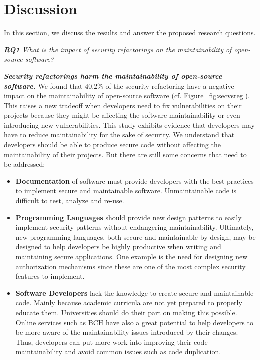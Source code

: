 \documentclass[sigconf,review]{acmart}
\begin{document}
\section{Discussion}\label{sec:discussion}

In this section, we discuss the results and answer the proposed research questions.

\begin{framed}
\textit{\textbf{RQ1} What is the impact of security refactorings on the maintainability
of open-source software?}
\vspace{-0.1cm}
\end{framed}
\vspace{-0.1cm}

\textbf{\textit{Security refactorings harm the maintainability of open-source software.}}
%
We found that $40.2\%$ of the security refactoring have a negative impact on the
maintainability of open-source software (cf. Figure~\ref{fig:secvsreg}). This raises
a new tradeoff when developers need to fix vulnerabilities on their projects
because they might be affecting the software maintainability or even introducing
new vulnerabilities. This study exhibits evidence that developers may have to
reduce maintainability for the sake of security. We understand that developers
should be able to produce secure code without affecting the maintainability of
their projects. But there are still some concerns that need to be addressed:
\begin{itemize}
	\item \textbf{Documentation} of software must provide developers with the
	best practices to implement secure and maintainable software. Unmaintainable
	code is difficult to test, analyze and re-use.

	\item\textbf{Programming Languages} should provide new design patterns to
	easily implement security patterns without endangering maintainability.
	Ultimately, new programming languages, both secure and maintainable by design,
	may be designed to help developers be highly productive when writing and
	maintaining  secure applications. One example is the need for designing new
	authorization mechanisms since these are one of the most complex security
	features to implement.

	\item \textbf{Software Developers} lack the knowledge to create secure and
	maintainable code. Mainly because academic curricula are not yet prepared
	to properly educate them. Universities should do their part on making
	this possible. Online services such as BCH have also a great potential to help
	developers to be more aware of the maintainability issues introduced by their
	changes. Thus, developers can put more work into improving their code maintainability
	and avoid common issues such as code duplication.

\end{itemize}
\end{document}
